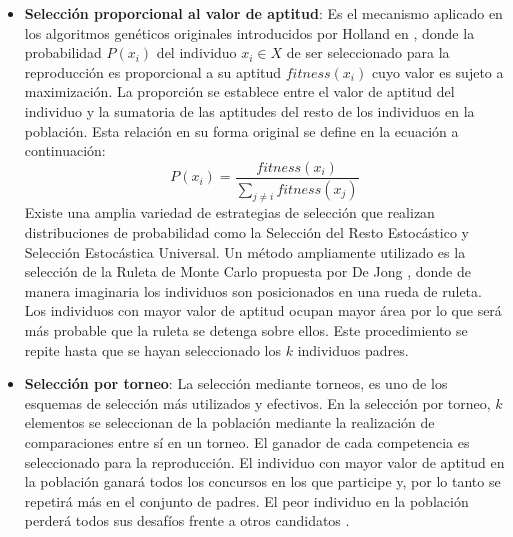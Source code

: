 \begin{itemize}
\item \textbf{Selección proporcional al valor de aptitud}: Es el mecanismo aplicado en los algoritmos genéticos originales introducidos por Holland en \cite{holland1992adaptation}, donde la probabilidad $P (x_i)$ del individuo $x_i \in X$ de ser seleccionado para la reproducción es proporcional a su aptitud $fitness (x_i)$ cuyo valor es sujeto a maximización. La proporción se establece entre el valor de aptitud del individuo y la sumatoria de las aptitudes del resto de los individuos en la población. Esta relación en su forma original se define en la ecuación a continuación:
\begin{equation} \label{key}
   P(x_i)= \frac{fitness(x_i)}{\sum_{j\neq i}{fitness(x_j)}}
\end{equation}
Existe una amplia variedad de estrategias de selección que realizan distribuciones de probabilidad como la Selección del Resto Estocástico y Selección Estocástica Universal. Un método ampliamente utilizado es la selección de la Ruleta de Monte Carlo propuesta por De Jong \cite{de1975analysis}, donde de manera imaginaria los individuos son posicionados en una rueda de ruleta. Los individuos con mayor valor de aptitud  ocupan mayor área por lo que será más probable que la ruleta se detenga sobre ellos. Este procedimiento se repite hasta que se hayan seleccionado los $k$ individuos padres. 
\item \textbf{Selección por torneo}: La selección mediante torneos, es uno de los esquemas de selección más utilizados y efectivos. En la selección por torneo, $k$ elementos se seleccionan de la población mediante la realización de comparaciones entre sí en un torneo. El ganador de cada competencia es seleccionado para la reproducción. El individuo con mayor valor de aptitud en la población ganará todos los concursos en los que participe y, por lo tanto se repetirá más en el conjunto de padres. El peor individuo en la población perderá todos sus desafíos frente a otros candidatos \cite{weise2009global}.

\end{itemize}


